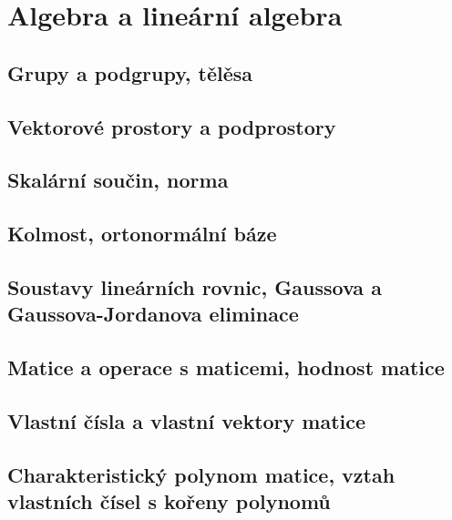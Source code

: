 \documentclass[../../main.tex]{subfiles}
\begin{document}
\section{Algebra a lineární algebra}

\subsection{Grupy a podgrupy, tělěsa}
\subsection{Vektorové prostory a podprostory}
\subsection{Skalární součin, norma}
\subsection{Kolmost, ortonormální báze}
\subsection{Soustavy lineárních rovnic, Gaussova a Gaussova-Jordanova eliminace}
\subsection{Matice a operace s maticemi, hodnost matice}
\subsection{Vlastní čísla a vlastní vektory matice}
\subsection{Charakteristický polynom matice, vztah vlastních čísel s kořeny polynomů}
\end{document}
